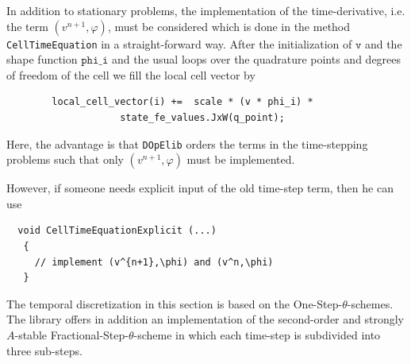 \documentclass[smallextended]{svjour3}       %
\numberwithin{equation}{section}
\renewcommand{\phi}{\varphi}
\newcommand{\dope}{\texttt{DOpElib}}
\begin{document}
In addition to stationary problems, the implementation
of the time-derivative, i.e. the term $ (v^{n+1},\phi)$, must be considered which is done
in the method \texttt{CellTimeEquation} in a straight-forward way. After the initialization of $\texttt{v}$ and the shape function $\texttt{phi\_i}$ and the usual loops over the quadrature points and  degrees of freedom of the cell we fill the local cell vector by
\begin{lstlisting}
        local_cell_vector(i) +=  scale * (v * phi_i) * 
                    state_fe_values.JxW(q_point);    
\end{lstlisting}
Here, the advantage is that \dope{} orders the terms in the time-stepping
problems
such that only $(v^{n+1},\phi)$ must be implemented. 



\begin{remark}
However, if someone 
needs explicit input of the old time-step term, then he can use 
\begin{lstlisting}
  void CellTimeEquationExplicit (...)
   {
     // implement (v^{n+1},\phi) and (v^n,\phi)  
   }
\end{lstlisting}
\end{remark}

\begin{remark}
The temporal discretization in this section 
is based on the One-Step-$\theta$-schemes. The library
offers in addition an implementation 
of the second-order and strongly $A$-stable 
Fractional-Step-$\theta$-scheme in which 
each time-step is subdivided into three 
sub-steps. 
\end{remark}
\end{document}

